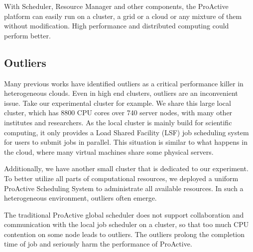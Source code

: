 With Scheduler, Resource Manager and other components, the ProActive platform can
 easily run on a cluster, a grid or a cloud or any mixture of them without
modification. High performance and distributed computing could perform better. 

\subsection{Outliers}

Many previous works have identified outliers as a critical performance killer in
heterogeneous clouds. Even in high end clusters, outliers are an inconvenient issue. Take our
experimental cluster for example. We share this large local cluster, which has 8800 CPU
cores over 740 server nodes, with many other institutes and researchers. As the local
cluster is mainly build for scientific computing, it only provides a Load Shared Facility
(LSF) job scheduling system for users to submit jobs in parallel. This situation is
similar to what happens in the cloud, where many virtual machines share some physical
servers.

Additionally, we have another small cluster that is dedicated to our experiment. To
better utilize all parts of computational resources, we deployed a uniform ProActive
Scheduling System to administrate all available resources. In such a
heterogeneous environment, outliers often emerge.

The traditional ProActive global scheduler does not support collaboration and
communication with the local job scheduler on a cluster, so that too much CPU contention
on some node leads to outliers. The outliers prolong the completion time of job and seriously harm
the performance of ProActive.

